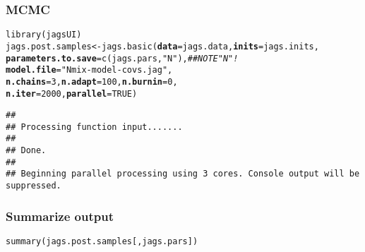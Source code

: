 \documentclass[color=usenames,dvipsnames]{beamer}\usepackage[]{graphicx}\usepackage[]{color}
\makeatletter
\newcommand{\hlnum}[1]{\textcolor[rgb]{0.69,0.494,0}{#1}}%
\newcommand{\hlstr}[1]{\textcolor[rgb]{0.749,0.012,0.012}{#1}}%
\newcommand{\hlcom}[1]{\textcolor[rgb]{0.514,0.506,0.514}{\textit{#1}}}%
\newcommand{\hlstd}[1]{\textcolor[rgb]{0,0,0}{#1}}%
\newcommand{\hlkwb}[1]{\textcolor[rgb]{0,0.341,0.682}{#1}}%
\newcommand{\hlkwc}[1]{\textcolor[rgb]{0,0,0}{\textbf{#1}}}%
\newcommand{\hlkwd}[1]{\textcolor[rgb]{0.004,0.004,0.506}{#1}}%
\newenvironment{kframe}{%
 \def\at@end@of@kframe{}%
 \ifinner\ifhmode%
  \def\at@end@of@kframe{\end{minipage}}%
  \begin{minipage}{\columnwidth}%
 \fi\fi%
 \def\FrameCommand##1{\hskip\@totalleftmargin \hskip-\fboxsep
 \colorbox{shadecolor}{##1}\hskip-\fboxsep
     \hskip-\linewidth \hskip-\@totalleftmargin \hskip\columnwidth}%
 \MakeFramed {\advance\hsize-\width
   \@totalleftmargin\z@ \linewidth\hsize
   \@setminipage}}%
 {\par\unskip\endMakeFramed%
 \at@end@of@kframe}
\newenvironment{knitrout}{}{} %
\makeatother
\begin{document}
\begin{frame}[fragile]
  \frametitle{MCMC}
  \small
\begin{knitrout}\scriptsize
{}\color{fgcolor}\begin{kframe}
\begin{alltt}
\hlkwd{library}\hlstd{(jagsUI)}
\hlstd{jags.post.samples} \hlkwb{<-} \hlkwd{jags.basic}\hlstd{(}\hlkwc{data}\hlstd{=jags.data,} \hlkwc{inits}\hlstd{=jags.inits,}
                                \hlkwc{parameters.to.save}\hlstd{=}\hlkwd{c}\hlstd{(jags.pars,} \hlstr{"N"}\hlstd{),} \hlcom{## NOTE "N"!}
                                \hlkwc{model.file}\hlstd{=}\hlstr{"Nmix-model-covs.jag"}\hlstd{,}
                                \hlkwc{n.chains}\hlstd{=}\hlnum{3}\hlstd{,} \hlkwc{n.adapt}\hlstd{=}\hlnum{100}\hlstd{,} \hlkwc{n.burnin}\hlstd{=}\hlnum{0}\hlstd{,}
                                \hlkwc{n.iter}\hlstd{=}\hlnum{2000}\hlstd{,} \hlkwc{parallel}\hlstd{=}\hlnum{TRUE}\hlstd{)}
\end{alltt}
\begin{verbatim}
## 
## Processing function input....... 
## 
## Done. 
##  
## Beginning parallel processing using 3 cores. Console output will be suppressed.
\end{verbatim}


{\ttfamily\noindent\bfseries{}}\end{kframe}
\end{knitrout}
\end{frame}



\begin{frame}[fragile]
  \frametitle{Summarize output}
\begin{knitrout}\tiny
{}\color{fgcolor}\begin{kframe}
\begin{alltt}
\hlkwd{summary}\hlstd{(jags.post.samples[,jags.pars])}
\end{alltt}


{\ttfamily\noindent\bfseries\color{errorcolor}{\#\# Error in h(simpleError(msg, call)): error in evaluating the argument 'object' in selecting a method for function 'summary': object 'jags.post.samples' not found}}\end{kframe}
\end{knitrout}
\end{frame}
\end{document}
